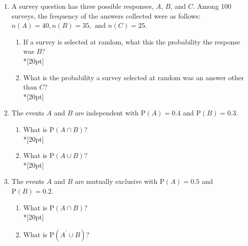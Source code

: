 \documentclass[12pt, oneside]{article}
\begin{document}
\begin{enumerate}
\item A survey question has three possible responses, $A$, $B$, and $C$. Among 100 surveys, the frequency of the answers collected were as follows: $n(A)=40, n(B)=35, \text{ and } n(C)=25$. 
\begin{enumerate}
    \item If a survey is selected at random, what this the probability the response was $B$?\\*[20pt]
    \item What is the probability a survey selected at random was an answer other than $C$?\\*[20pt]
\end{enumerate}

\item The events $A$ and $B$ are independent with $\mathrm P(A)=0.4$ and $\mathrm P(B)=0.3$. 
\begin{enumerate}
    \item What is $\mathrm P(A \cap B)$?\\*[20pt]
    \item What is $\mathrm P(A \cup B)$?\\*[20pt]
\end{enumerate}

\item The events $A$ and $B$ are mutually exclusive with $\mathrm P(A)=0.5$ and $\mathrm P(B)=0.2$. 
\begin{enumerate}
    \item What is $\mathrm P(A \cap B)$?\\*[20pt]
    \item What is $\mathrm P(A^\prime \cup B)$?
\end{enumerate}



\end{enumerate}
\end{document}
